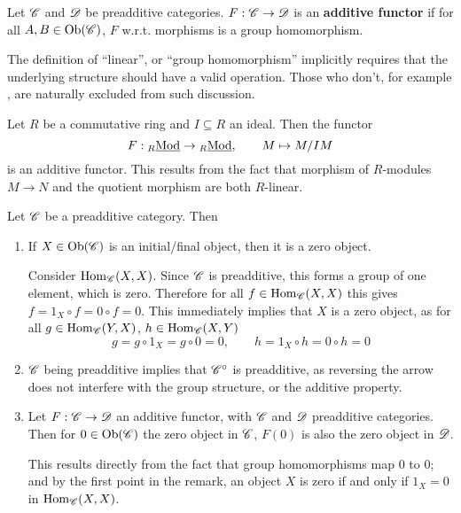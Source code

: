 \begin{definition}
    Let $\mathscr{C}$ and $\mathscr{D}$ be preadditive categories. $F: \mathscr{C} \to \mathscr{D}$ is an \textbf{additive functor} if for all $A, B \in \mathrm{Ob}(\mathscr{C})$, $F$ w.r.t. morphisms is a group homomorphism.
\end{definition}

\begin{remark}
    The definition of ``linear'', or ``group homomorphism'' implicitly requires that the underlying structure should have a valid operation. Those who don't, for example \catsets, are naturally excluded from such discussion.
\end{remark}

\begin{example}
    Let $R$ be a commutative ring and $I \subseteq R$ an ideal. Then the functor
    \[
        F: {}_{R}\underline{\textup{Mod}} \to {}_{R}\underline{\textup{Mod}}, \qquad M \mapsto M/IM
    \]
    is an additive functor. This results from the fact that morphism of $R$-modules $M \to N$ and the quotient morphism are both $R$-linear.
\end{example}

\begin{remark}
    Let $\mathscr{C}$ be a preadditive category. Then
    \begin{enumerate}
        \item If $X \in \mathrm{Ob}(\mathscr{C})$ is an initial/final object, then it is a zero object. 
        
        Consider $\mathrm{Hom}_{\mathscr{C}}(X, X)$. Since $\mathscr{C}$ is preadditive, this forms a group of one element, which is zero. Therefore for all $f \in \mathrm{Hom}_{\mathscr{C}}(X, X)$ this gives $f = 1_X \circ f = 0 \circ f = 0$. This immediately implies that $X$ is a zero object, as for all $g \in \mathrm{Hom}_{\mathscr{C}}(Y, X)$, $h \in \mathrm{Hom}_{\mathscr{C}}(X, Y)$
        \[
            g = g \circ 1_{X} = g\circ 0 = 0, \qquad h = 1_X \circ h = 0 \circ h = 0
        \]
        \item $\mathscr{C}$ being preadditive implies that $\mathscr{C}^{\circ}$ is preadditive, as reversing the arrow does not interfere with the group structure, or the additive property.
        \item Let $F: \mathscr{C} \to \mathscr{D}$ an additive functor, with $\mathscr{C}$ and $
        \mathscr{D}$ preadditive categories. Then for $0 \in \mathrm{Ob}(\mathscr{C})$ the zero object in $\mathscr{C}$, $F(0)$ is also the zero object in $\mathscr{D}$.
        
        This results directly from the fact that group homomorphisms map $0$ to $0$; and by the first point in the remark, an object $X$ is zero if and only if $1_X = 0$ in $\mathrm{Hom}_{\mathscr{C}}(X, X)$.
    \end{enumerate}
\end{remark}

